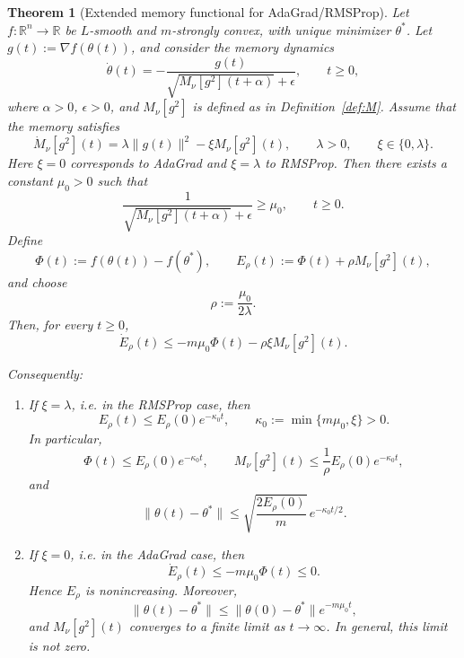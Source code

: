 \documentclass{article} %
\newtheorem{theorem}{Theorem}
\begin{document}
\begin{theorem}[Extended memory functional for AdaGrad/RMSProp]
\label{thm:extended_memory_adagrad_rmsprop}
Let \(f:\mathbb R^n\to\mathbb R\) be \(L\)-smooth and \(m\)-strongly convex, with unique minimizer \(\theta^*\). Let \(g(t):=\nabla f(\theta(t))\), and consider the memory dynamics
\begin{equation}
\label{eq:shifted_memory_dynamics_thm2}
\dot\theta(t)
=
-
\frac{g(t)}
{\sqrt{M_\nu[g^2](t+\alpha)}+\epsilon},
\qquad t\ge 0,
\end{equation}
where \(\alpha>0\), \(\epsilon>0\), and \(M_\nu[g^2]\) is defined as in Definition~\ref{def:M}. Assume that the memory satisfies
\begin{equation}
\label{eq:memory_ode_thm2}
\dot M_\nu[g^2](t)
=
\lambda \|g(t)\|^2-\xi M_\nu[g^2](t),
\qquad 
\lambda>0,
\qquad 
\xi\in\{0,\lambda\}.
\end{equation}
Here \(\xi=0\) corresponds to AdaGrad and \(\xi=\lambda\) to RMSProp. Then there exists a constant \(\mu_0>0\) such that
\[
\frac{1}{\sqrt{M_\nu[g^2](t+\alpha)}+\epsilon}
\ge
\mu_0,
\qquad t\ge 0.
\]
Define
\[
\Phi(t):=f(\theta(t))-f(\theta^*),
\qquad
E_\rho(t):=\Phi(t)+\rho M_\nu[g^2](t),
\]
and choose
\[
\rho:=\frac{\mu_0}{2\lambda}.
\]
Then, for every \(t\ge 0\),
\begin{equation}
\label{eq:E_dissipation_thm2}
\dot E_\rho(t)
\le
-
m\mu_0\Phi(t)
-
\rho\xi M_\nu[g^2](t).
\end{equation}

Consequently:
\begin{enumerate}
\item If \(\xi=\lambda\), i.e. in the RMSProp case, then
\[
E_\rho(t)
\le
E_\rho(0)e^{-\kappa_0 t},
\qquad
\kappa_0:=\min\{m\mu_0,\xi\}>0.
\]
In particular,
\[
\Phi(t)\le E_\rho(0)e^{-\kappa_0 t},
\qquad
M_\nu[g^2](t)
\le
\frac{1}{\rho}E_\rho(0)e^{-\kappa_0 t},
\]
and
\[
\|\theta(t)-\theta^*\|
\le
\sqrt{\frac{2E_\rho(0)}{m}}\,e^{-\kappa_0 t/2}.
\]

\item If \(\xi=0\), i.e. in the AdaGrad case, then
\[
\dot E_\rho(t)\le -m\mu_0\Phi(t)\le 0.
\]
Hence \(E_\rho\) is nonincreasing. Moreover,
\[
\|\theta(t)-\theta^*\|
\le
\|\theta(0)-\theta^*\|e^{-m\mu_0 t},
\]
and \(M_\nu[g^2](t)\) converges to a finite limit as \(t\to\infty\). In general, this limit is not zero.
\end{enumerate}
\end{theorem}
\end{document}
